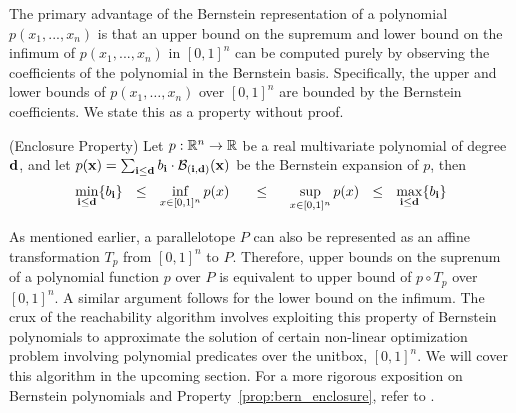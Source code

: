 The primary advantage of the Bernstein representation of a polynomial $p(x_1,...,x_n)$ is that an upper bound on the supremum and lower bound on the infimum of $p(x_1,...,x_n)$ in $[0,1]^{n}$ can be computed purely by observing the coefficients of the polynomial in the Bernstein basis. Specifically, the upper and lower bounds of $p(x_1,\ldots,x_n)$ over $[0,1]^n$ are bounded by the Bernstein coefficients. We state this as a property without proof.

\begin{property} (Enclosure Property)
  \label{prop:bern_enclosure}
  Let $p: {\mathbb{R}}^n \rightarrow {\mathbb{R}}$ be a real multivariate polynomial of degree ${\bf d}$, and let $p({\bf x}) = \sum_{{\bf i} \leq {\bf d}} b_{\bf i} \cdot \mathcal{B}_{({\bf i},{\bf d})}({\bf x})$ be the Bernstein expansion of $p$, then
  $$
  \min_{{\bf i} \leq {\bf d}} \{b_{\bf i}\} ~~\leq~~ \inf_{x \in [0,1]^n} p(x) ~~~~~\leq~~~~ \sup_{x \in [0,1]^{n}} p(x) ~~\leq~~ \max_{{\bf i} \leq {\bf d}} \{b_{\bf i}\}
  $$
\end{property}


As mentioned earlier, a parallelotope $P$ can also be represented as an affine transformation $T_{p}$ from $[0,1]^{n}$ to $P$.
%
Therefore, upper bounds on the suprenum of a polynomial function $p$ over $P$ is equivalent to upper bound of $p \circ T_{p}$ over $[0,1]^{n}$.
%
A similar argument follows for the lower bound on the infimum.
%
The crux of the reachability algorithm involves exploiting this property of Bernstein polynomials to approximate the solution of certain non-linear optimization problem involving polynomial predicates over the unitbox, $[0,1]^n$.
%
We will cover this algorithm in the upcoming section.
%
For a more rigorous exposition on Bernstein polynomials and Property~\ref{prop:bern_enclosure}, refer to \cite{garloff2003bernstein}.


